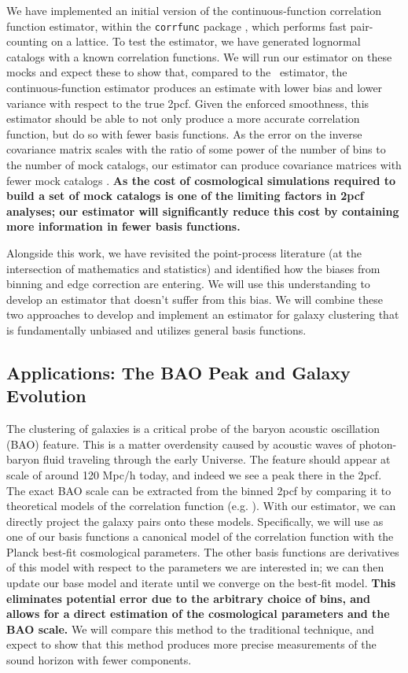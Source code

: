 \documentclass[12pt, fullpage, letterpaper]{article}
\newcommand{\cf}{2pcf\xspace}
\newcommand{\LS}{\acronym{LS}\xspace}
\begin{document}
We have implemented an initial version of the continuous-function correlation function estimator, within the \texttt{corrfunc} package \citep{Sinha2017}, which performs fast pair-counting on a lattice.
To test the estimator, we have generated lognormal catalogs with a known correlation functions. 
We will run our estimator on these mocks and expect these to show that, compared to the \LS\
  estimator, the continuous-function estimator produces an estimate with lower bias and
  lower variance with respect to the true \cf.
Given the enforced smoothness, this estimator should be able to not only produce a more accurate correlation function, but do so with fewer basis functions.
As the error on the inverse covariance matrix scales with the ratio of some power of the number of bins to the number of mock catalogs, our estimator can produce covariance matrices with fewer mock catalogs \citep{Hartlap2007}.
\textbf{As the cost of cosmological simulations required to build a set of mock catalogs is one of the limiting factors in \cf analyses; our estimator will significantly reduce this cost by containing more information in fewer basis functions.}

Alongside this work, we have revisited the point-process literature (at the intersection of mathematics and statistics) and identified how the biases from binning and edge correction are entering. 
We will use this understanding to develop an estimator that doesn't suffer from this bias.
We will combine these two approaches to develop and implement an estimator for galaxy clustering that is fundamentally unbiased and utilizes general basis functions.

\subsection{Applications: The BAO Peak and Galaxy Evolution}

The clustering of galaxies is a critical probe of the baryon acoustic oscillation (BAO) feature. 
This is a matter overdensity caused by acoustic waves of photon-baryon fluid traveling through the early Universe. 
The feature should appear at scale of around 120 Mpc/h today, and indeed we see a peak there in the \cf \citep{Eisenstein2005}. 
The exact BAO scale can be extracted from the binned \cf by comparing it to theoretical models of the correlation function (e.g. \citealt{Anderson2014}). 
With our estimator, we can directly project the galaxy pairs onto these models. 
Specifically, we will use as one of our basis functions a canonical model of the correlation function with the Planck best-fit cosmological parameters. 
The other basis functions are derivatives of this model with respect to the parameters we are interested in; we can then update our base model and iterate until we converge on the best-fit model.
\textbf{This eliminates potential error due to the arbitrary choice of bins, and allows for a direct estimation of the cosmological parameters and the BAO scale.}
We will compare this method to the traditional technique, and expect to show that this method produces more precise measurements of the sound horizon with fewer components.
\end{document}
